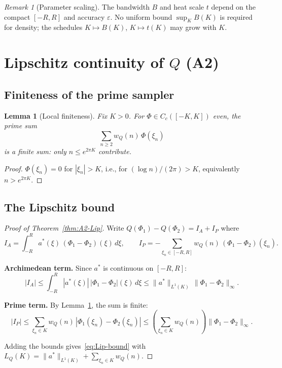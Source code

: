 \documentclass[11pt,a4paper]{article}
\newtheorem{lemma}[theorem]{Lemma}
\theoremstyle{definition}
\theoremstyle{remark}
\newtheorem{remark}[theorem]{Remark}
\begin{document}
\begin{remark}[Parameter scaling]
The bandwidth $B$ and heat scale $t$ depend on the compact $[-R, R]$ and accuracy $\varepsilon$. No uniform bound $\sup_K B(K)$ is required for density; the schedules $K \mapsto B(K)$, $K \mapsto t(K)$ may grow with $K$.
\end{remark}

\section{Lipschitz continuity of $Q$ (A2)}

\subsection{Finiteness of the prime sampler}

\begin{lemma}[Local finiteness]\label{lem:local-finite}
Fix $K > 0$. For $\Phi \in C_c([-K, K])$ even, the prime sum
\[
  \sum_{n \geq 2} w_Q(n)\, \Phi(\xi_n)
\]
is a finite sum: only $n \leq e^{2\pi K}$ contribute.
\end{lemma}

\begin{proof}
$\Phi(\xi_n) = 0$ for $|\xi_n| > K$, i.e., for $(\log n)/(2\pi) > K$, equivalently $n > e^{2\pi K}$.
\end{proof}

\subsection{The Lipschitz bound}

\begin{proof}[Proof of Theorem~\ref{thm:A2-Lip}]
Write $Q(\Phi_1) - Q(\Phi_2) = I_A + I_P$ where
\[
  I_A = \int_{-R}^R a^*(\xi)\, (\Phi_1 - \Phi_2)(\xi)\, d\xi, \qquad
  I_P = -\sum_{\xi_n \in [-R,R]} w_Q(n)\, (\Phi_1 - \Phi_2)(\xi_n).
\]

\textbf{Archimedean term.} Since $a^*$ is continuous on $[-R, R]$:
\[
  |I_A| \leq \int_{-R}^R |a^*(\xi)|\, |\Phi_1 - \Phi_2|(\xi)\, d\xi \leq \|a^*\|_{L^1(K)}\, \|\Phi_1 - \Phi_2\|_\infty.
\]

\textbf{Prime term.} By Lemma~\ref{lem:local-finite}, the sum is finite:
\[
  |I_P| \leq \sum_{\xi_n \in K} w_Q(n)\, |\Phi_1(\xi_n) - \Phi_2(\xi_n)| \leq \left( \sum_{\xi_n \in K} w_Q(n) \right) \|\Phi_1 - \Phi_2\|_\infty.
\]

Adding the bounds gives~\eqref{eq:Lip-bound} with $L_Q(K) = \|a^*\|_{L^1(K)} + \sum_{\xi_n \in K} w_Q(n)$.
\end{proof}
\end{document}
